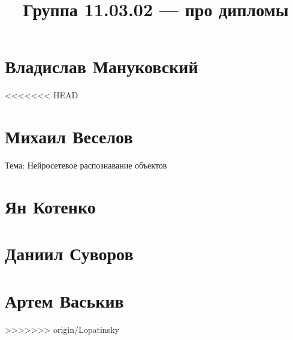 \documentclass{article}
\title{Группа 11.03.02 --- про дипломы}
\begin{document}
\section*{Владислав Мануковский}

<<<<<<< HEAD
\section*{Михаил Веселов}
Тема: Нейросетевое распознавание объектов

\section*{Ян Котенко}

\section*{Даниил Суворов}

\section*{Артем Васькив}
>>>>>>> origin/Lopatinsky
\end{document}
